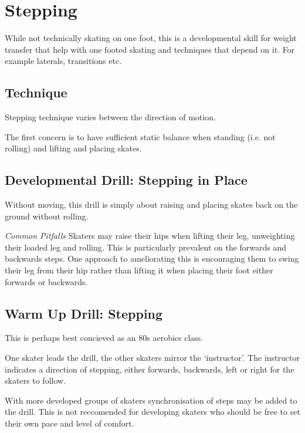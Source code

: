 \section{Stepping}
While not technically skating on one foot, this is a developmental skill for weight transfer that help with one footed skating and techniques that depend on it. For example laterals, transitions etc.   


\subsection*{Technique}

Stepping technique varies between the direction of motion. 

The first concern is to have sufficient static balance when standing (i.e. not rolling) and lifting and placing skates.  




\subsection*{Developmental Drill: Stepping in Place} 
\label{drill:one_foot/stepping/in_place}
Without moving, this drill is simply about raising and placing skates back on the ground without rolling.


{\it Common Pitfalls}
Skaters may raise their hips when lifting their leg, unweighting their loaded leg and rolling. This is particularly prevalent on the forwards and backwards steps. 
One approach to ameliorating this is encouraging them to swing their leg from their hip rather than lifting it when placing their foot either forwards or backwards. 


\subsection*{Warm Up Drill: Stepping} 
\label{drill:one_foot/stepping/warm_up}

This is perhaps best concieved as an 80s aerobics class.

One skater leads the drill, the other skaters mirror the `instructor'.
The instructor indicates a direction of stepping, either forwards, backwards, left or right for the skaters to follow.


With more developed groups of skaters synchronisation of steps may be added to the drill. This is not reccomended for developing skaters who should be free to set their own pace and level of comfort.



